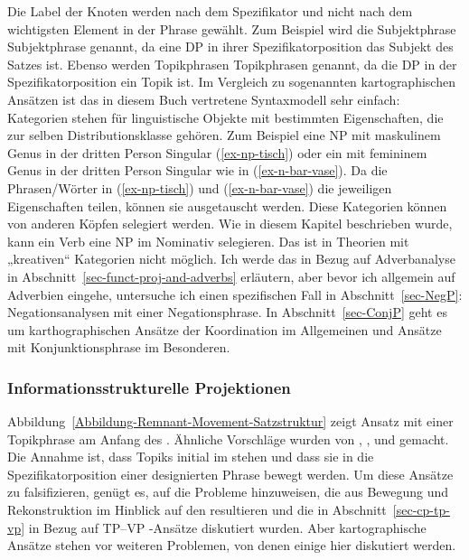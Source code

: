 Die Label der Knoten werden nach dem Spezifikator und nicht nach dem wichtigsten Element
in der Phrase gewählt. Zum Beispiel wird die Subjektphrase Subjektphrase genannt, da eine DP in ihrer Spezifikatorposition das Subjekt des Satzes ist. Ebenso werden Topikphrasen Topikphrasen genannt, da die DP
in der Spezifikatorposition ein Topik ist.
Im Vergleich zu sogenannten kartographischen Ansätzen ist das in diesem Buch vertretene Syntaxmodell sehr einfach: Kategorien stehen für linguistische Objekte
mit bestimmten Eigenschaften, die zur selben Distributionsklasse gehören. Zum Beispiel eine NP mit maskulinem
Genus in der dritten Person Singular (\ref{ex-np-tisch}) oder ein \nbar{} mit femininem Genus in der dritten Person
Singular wie in (\ref{ex-n-bar-vase}). Da die Phrasen/Wörter in (\ref{ex-np-tisch}) und
(\ref{ex-n-bar-vase}) die jeweiligen Eigenschaften teilen, können sie ausgetauscht werden. Diese Kategorien können
von anderen Köpfen selegiert werden. Wie in diesem Kapitel beschrieben wurde, kann ein Verb eine NP im
Nominativ selegieren. Das ist in Theorien mit „kreativen`` Kategorien nicht möglich. Ich werde das in
Bezug auf  Adverbanalyse in Abschnitt~\ref{sec-funct-proj-and-adverbs} erläutern, aber
bevor ich allgemein auf Adverbien eingehe, untersuche ich einen spezifischen Fall in
Abschnitt~\ref{sec-NegP}: Negationsanalysen mit einer Negationsphrase. In Abschnitt~\ref{sec-ConjP}
geht es um karthographischen Ansätze der Koordination im Allgemeinen und Ansätze mit Konjunktionsphrase im Besonderen.


\subsubsection{Informationsstrukturelle Projektionen}

Abbildung~\ref{Abbildung-Remnant-Movement-Satzstruktur} zeigt  Ansatz mit einer Topikphrase am
Anfang des \mf. Ähnliche Vorschläge wurden von \citet[, 495]{MS93a-u}, \citet{Haftka95a}, \citet{Frey2004b-u} und
\citet[]{Grewendorf2005a-u} gemacht. Die Annahme ist, dass Topiks
initial im \mf{} stehen und dass sie in die Spezifikatorposition einer designierten Phrase bewegt werden. Um
diese Ansätze zu falsifizieren, genügt es, auf die Probleme hinzuweisen, die aus Bewegung und
Rekonstruktion im Hinblick auf den  resultieren und die in Abschnitt~\ref{sec-cp-tp-vp} in Bezug auf TP--VP%
-Ansätze diskutiert wurden. Aber kartographische Ansätze stehen vor weiteren Problemen, von denen einige hier
diskutiert werden.

